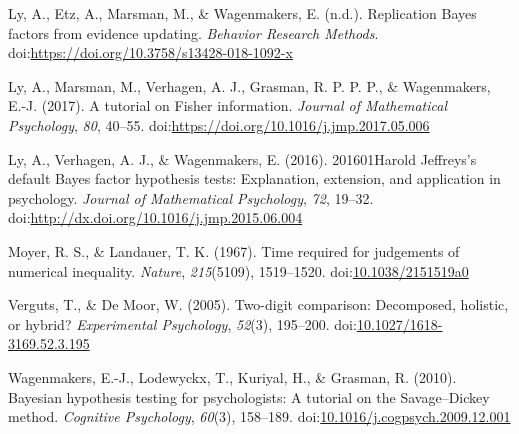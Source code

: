 \documentclass[english,,doc,floatsintext]{apa6}
\begin{document}
\leavevmode\hypertarget{ref-ly2017replication}{}%
Ly, A., Etz, A., Marsman, M., \& Wagenmakers, E. (n.d.). Replication Bayes factors from evidence updating. \emph{Behavior Research Methods}. doi:\href{https://doi.org/https://doi.org/10.3758/s13428-018-1092-x}{https://doi.org/10.3758/s13428-018-1092-x}

\leavevmode\hypertarget{ref-ly2017tutorial}{}%
Ly, A., Marsman, M., Verhagen, A. J., Grasman, R. P. P. P., \& Wagenmakers, E.-J. (2017). A tutorial on Fisher information. \emph{Journal of Mathematical Psychology}, \emph{80}, 40--55. doi:\href{https://doi.org/https://doi.org/10.1016/j.jmp.2017.05.006}{https://doi.org/10.1016/j.jmp.2017.05.006}

\leavevmode\hypertarget{ref-ly2016harold}{}%
Ly, A., Verhagen, A. J., \& Wagenmakers, E. (2016). 201601Harold Jeffreys's default Bayes factor hypothesis tests: Explanation, extension, and application in psychology. \emph{Journal of Mathematical Psychology}, \emph{72}, 19--32. doi:\href{https://doi.org/http://dx.doi.org/10.1016/j.jmp.2015.06.004}{http://dx.doi.org/10.1016/j.jmp.2015.06.004}

\leavevmode\hypertarget{ref-moyer1967}{}%
Moyer, R. S., \& Landauer, T. K. (1967). Time required for judgements of numerical inequality. \emph{Nature}, \emph{215}(5109), 1519--1520. doi:\href{https://doi.org/10.1038/2151519a0}{10.1038/2151519a0}

\leavevmode\hypertarget{ref-vergutsDeMoor2005}{}%
Verguts, T., \& De Moor, W. (2005). Two-digit comparison: Decomposed, holistic, or hybrid? \emph{Experimental Psychology}, \emph{52}(3), 195--200. doi:\href{https://doi.org/10.1027/1618-3169.52.3.195}{10.1027/1618-3169.52.3.195}

\leavevmode\hypertarget{ref-wagenmakers2010}{}%
Wagenmakers, E.-J., Lodewyckx, T., Kuriyal, H., \& Grasman, R. (2010). Bayesian hypothesis testing for psychologists: A tutorial on the Savage--Dickey method. \emph{Cognitive Psychology}, \emph{60}(3), 158--189. doi:\href{https://doi.org/10.1016/j.cogpsych.2009.12.001}{10.1016/j.cogpsych.2009.12.001}
\end{document}
